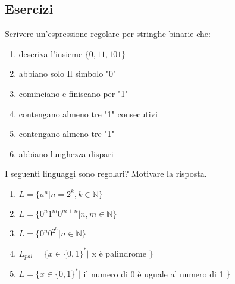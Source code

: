 \documentclass[a4paper,11pt]{article}
\begin{document}
\subsection{Esercizi}
Scrivere un'espressione regolare per stringhe binarie che:
\begin{enumerate}
    \item descriva l'insieme \(\{0,11,101\}\)
    \item abbiano solo Il simbolo "0"
    \item cominciano e finiscano per "1"
    \item contengano almeno tre "1" consecutivi
    \item contengano almeno tre "1"
    \item abbiano lunghezza dispari
\end{enumerate}
I seguenti linguaggi sono regolari? Motivare la risposta. 
\begin{enumerate}
    \item $L=\{a^n|n=2^k, k\in \mathbb{N} \}$
    \item $L=\{0^n1^m0^{m+n}|n,m\in\mathbb{N} \}$
    \item $L=\{0^n0^{2^n}|n\in\mathbb{N} \}$
    \item $L_{pal}=\{x\in\{0,1\}^*|$ x è palindrome $\}$
    \item $L=\{x\in\{0,1\}^*|$ il numero di 0 è uguale al numero di 1 $\}$
\end{enumerate}
\end{document}
